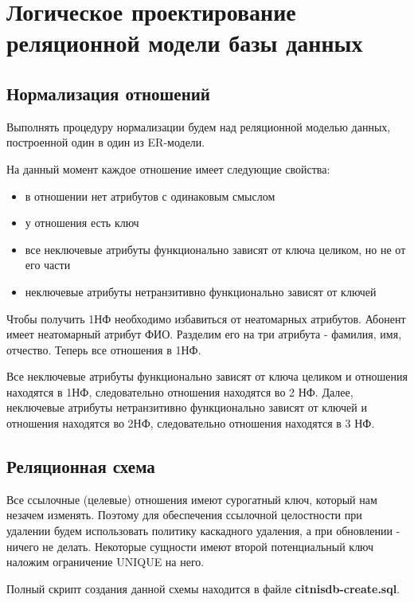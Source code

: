 \documentclass{report}
\begin{document}
\chapter{Логическое проектирование реляционной модели базы данных}

\section{Нормализация отношений}

Выполнять процедуру нормализации будем над реляционной моделью 
данных, построенной один в один из ER-модели. 

На данный момент 
каждое отношение имеет следующие свойства:
\begin{itemize}
    \item в отношении нет атрибутов с одинаковым смыслом
    \item у отношения есть ключ
    \item все неключевые атрибуты функционально зависят от ключа целиком, но не от его части
    \item неключевые атрибуты нетранзитивно функционально зависят от ключей
\end{itemize} 
Чтобы получить 1НФ необходимо избавиться от неатомарных атрибутов. 
Абонент имеет неатомарный атрибут ФИО. Разделим его на три атрибута - 
фамилия, имя, отчество. Теперь все отношения в 1НФ.

Все неключевые атрибуты функционально зависят от ключа целиком и отношения
находятся в 1НФ, следовательно отношения находятся во 2 НФ. Далее, неключевые 
атрибуты нетранзитивно функционально зависят от ключей и отношения находятся
во 2НФ, следовательно отношения находятся в 3 НФ.

\section{Реляционная схема}

Все ссылочные (целевые) отношения имеют сурогатный ключ, который
нам незачем изменять. Поэтому для обеспечения ссылочной целостности
при удалении будем использовать политику каскадного удаления, 
а при обновлении - ничего не делать. Некоторые сущности 
имеют второй потенциальный ключ наложим ограничение UNIQUE на него.

Полный скрипт создания данной схемы находится в файле \textbf{citnisdb-create.sql}.
\end{document}
